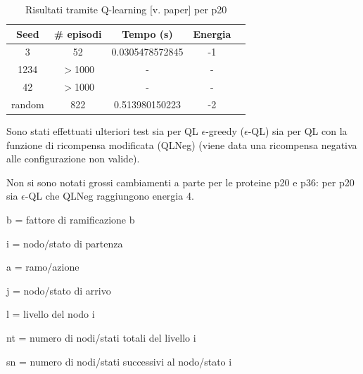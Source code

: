 \documentclass[conference]{IEEEtran}
\begin{document}
\begin{table}[H]
\begin{center}
\begin{tabular}{|c|c|c|c|c|}
\hline
\textbf{Seed} & \textbf{\# episodi} & \textbf{Tempo (s)} & \textbf{Energia} \\ \hline
3 & 52 & 0.0305478572845 & -1 \\ \hline
1234 & $>$1000 & - & - \\ \hline
42 & $>$1000 & - & - \\ \hline
random & 822 & 0.513980150223 & -2 \\ \hline
\end{tabular}
\end{center}
\caption{Risultati tramite Q-learning [v. paper] per p20}
\end{table}

Sono stati effettuati ulteriori test sia per QL $\epsilon$-greedy ($\epsilon$-QL) sia per QL con la funzione di ricompensa modificata (QLNeg) (viene data una ricompensa negativa alle configurazione non valide).

Non si sono notati grossi cambiamenti a parte per le proteine p20 e p36: per p20 sia $\epsilon$-QL che QLNeg raggiungono energia 4.

\appendix
\label{appendix:sviluppo}

b = fattore di ramificazione b

i = nodo/stato di partenza

a = ramo/azione

j = nodo/stato di arrivo

l = livello del nodo i

nt = numero di nodi/stati totali del livello i

sn = numero di nodi/stati successivi al nodo/stato i
\end{document}
